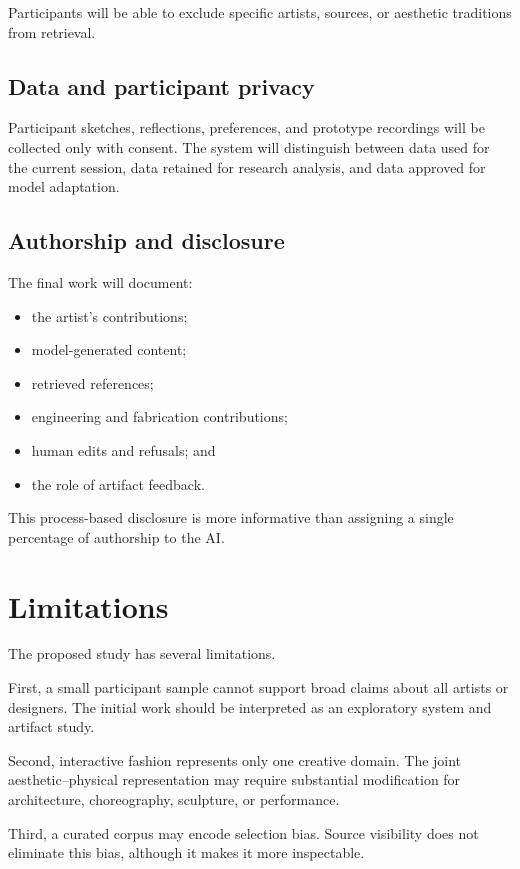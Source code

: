 \documentclass{article}
\begin{document}
Participants will be able to exclude specific artists, sources, or aesthetic
traditions from retrieval.

\subsection{Data and participant privacy}

Participant sketches, reflections, preferences, and prototype recordings will
be collected only with consent. The system will distinguish between data used
for the current session, data retained for research analysis, and data approved
for model adaptation.

\subsection{Authorship and disclosure}

The final work will document:

\begin{itemize}[leftmargin=*]
    \item the artist's contributions;
    \item model-generated content;
    \item retrieved references;
    \item engineering and fabrication contributions;
    \item human edits and refusals; and
    \item the role of artifact feedback.
\end{itemize}

This process-based disclosure is more informative than assigning a single
percentage of authorship to the AI.

\section{Limitations}

The proposed study has several limitations.

First, a small participant sample cannot support broad claims about all artists
or designers. The initial work should be interpreted as an exploratory system
and artifact study.

Second, interactive fashion represents only one creative domain. The joint
aesthetic--physical representation may require substantial modification for
architecture, choreography, sculpture, or performance.

Third, a curated corpus may encode selection bias. Source visibility does not
eliminate this bias, although it makes it more inspectable.
\end{document}
